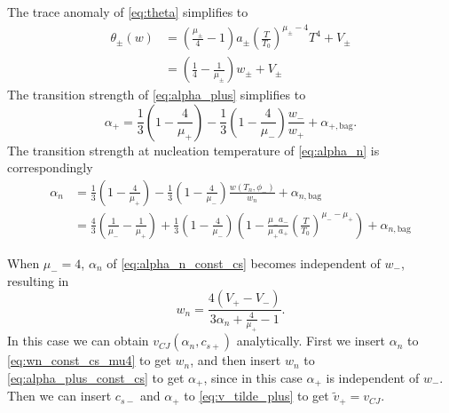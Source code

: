 The trace anomaly of \eqref{eq:theta} simplifies to
\begin{align}
\theta_\pm(w)
&= \left( \frac{\mu_\pm}{4} - 1 \right) a_\pm \left( \frac{T}{T_0} \right)^{\mu_\pm - 4} T^4 + V_\pm \\
&= \left( \frac{1}{4} - \frac{1}{\mu_\pm} \right) w_\pm + V_\pm
\label{eq:theta_const_cs}
\end{align}
The transition strength of \eqref{eq:alpha_plus} simplifies to
\begin{equation}
\alpha_+ = \frac{1}{3} \left( 1 - \frac{4}{\mu_+} \right) - \frac{1}{3} \left(1 - \frac{4}{\mu_-} \right) \frac{w_-}{w_+} + \alpha_{+,\text{bag}}.
\label{eq:alpha_plus_const_cs}
\end{equation}
The transition strength at nucleation temperature of \eqref{eq:alpha_n} is correspondingly
\begin{align}
\alpha_n &= \frac{1}{3} \left( 1 - \frac{4}{\mu_+} \right) - \frac{1}{3} \left(1 - \frac{4}{\mu_-} \right) \frac{w(T_n, \phi_-)}{w_n} + \alpha_{n,\text{bag}} \\
&= \frac{4}{3} \left( \frac{1}{\mu_-} - \frac{1}{\mu_+} \right) + \frac{1}{3} \left( 1 - \frac{4}{\mu_-} \right)
\left( 1 - \frac{\mu_- a_-}{\mu_+ a_+} \left( \frac{T}{T_0} \right)^{\mu_- - \mu_+} \right) + \alpha_{n,\text{bag}}
\label{eq:alpha_n_const_cs}
\end{align}
\iffalse
Inverting this gives the enthalpy at the nucleation temperature
\begin{equation}
w_n = \frac{V_+ - V_-}{ \frac{3}{4} \alpha_n + \frac{1}{\mu_+} - \frac{1}{\mu_-} }.
\label{eq:wn_const_cs}
\end{equation}
\fi
When $\mu_- = 4$, $\alpha_n$ of \eqref{eq:alpha_n_const_cs} becomes independent of $w_-$, resulting in
\begin{equation}
w_n = \frac{4 (V_+ - V_-)}{3 \alpha_n + \frac{4}{\mu_+} - 1}.
\label{eq:wn_const_cs_mu4}
\end{equation}
In this case we can obtain $v_{CJ}(\alpha_n, c_{s+})$ analytically.
First we insert $\alpha_n$ to \eqref{eq:wn_const_cs_mu4} to get $w_n$,
and then insert $w_n$ to \eqref{eq:alpha_plus_const_cs} to get $\alpha_+$,
since in this case $\alpha_+$ is independent of $w_-$.
Then we can insert $c_{s-}$ and $\alpha_+$ to \eqref{eq:v_tilde_plus} to get $\tilde{v}_+ = v_{CJ}$.

\iffalse
Now we have everything necessary to compute $\alpha_+$ and the Chapman-Jouguet speed $v_{CJ}$ analytically from $c_{s+}$, $c_{s-}$ and $\alpha_n$.
From these we get $w_n$ with \eqref{eq:wn_const_cs}, and for a detonation $w_+=w_n$.
This we can insert to \eqref{eq:wm_const_cs}, giving us $w_-$.
Now we have all the variables necessary to compute $\alpha_+$ with \eqref{eq:alpha_plus}.
Then we insert $\tilde{v}_- = c_{s-}$ to \eqref{eq:v_tilde_plus}, giving us the Chapman-Jouguet speed $v_{CJ} = v_+$.
\todo{This is wrong! We have a circular dependency and must solve the equation group at once.}
\fi

